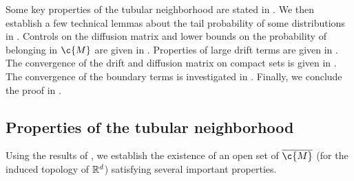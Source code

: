 Some key properties of the tubular neighborhood are stated in .
We then establish a few technical lemmas about the tail probability of some distributions in .
Controls on the diffusion matrix and lower bounds on the probability of belonging in $\c{M}$ are given in .
Properties of large drift terms are given in .
The convergence of the drift and diffusion matrix on compact sets is given in .
The convergence of the boundary terms is investigated in .
Finally, we conclude the proof in .

\subsection{Properties of the tubular neighborhood}
\label{sec:tubular_properties}

Using the results of \cite{lee2013smooth}, we establish the existence of an open set of $\cl{\c{M}}$ (for the induced topology of $\mathbb{R}^d$) satisfying several important properties.

